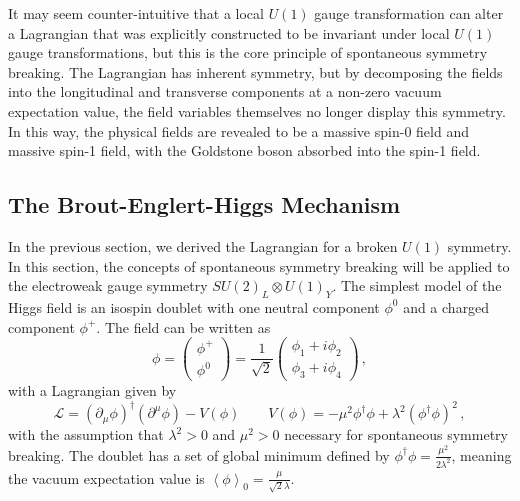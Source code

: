 It may seem counter-intuitive that a local $U(1)$ gauge transformation can alter a Lagrangian that was explicitly constructed to be invariant under local $U(1)$ gauge transformations, but this is the core principle of spontaneous symmetry breaking. The Lagrangian has inherent symmetry, but by decomposing the fields into the longitudinal and transverse components at a non-zero vacuum expectation value, the field variables themselves no longer display this symmetry. In this way, the physical fields are revealed to be a massive spin-0 field and massive spin-1 field, with the Goldstone boson absorbed into the spin-1 field.

\subsection{The Brout-Englert-Higgs Mechanism} \label{sec:sm_theory_beh}
In the previous section, we derived the Lagrangian for a broken $U(1)$ symmetry. In this section, the concepts of spontaneous symmetry breaking will be applied to the electroweak gauge symmetry $SU(2)_L\otimes U(1)_Y$. The simplest model of the Higgs field is an isospin doublet with one neutral component $\phi^0$ and a charged component $\phi^+$. The field can be written as
\begin{equation}
	\phi=\begin{pmatrix}\phi^+\\\phi^0\end{pmatrix}=\frac{1}{\sqrt{2}}\begin{pmatrix}\phi_1+i\phi_2\\\phi_3+i\phi_4\end{pmatrix}\,,
\end{equation}
with a Lagrangian given by
\begin{equation}
	\mathcal{L}=(\partial_\mu\phi)^\dagger(\partial^\mu\phi)-V(\phi) \qquad V(\phi)=-\mu^2\phi^\dagger\phi+\lambda^2(\phi^\dagger\phi)^2\,,
\end{equation}
with the assumption that $\lambda^2>0$ and $\mu^2>0$ necessary for spontaneous symmetry breaking.  The doublet has a set of global minimum defined by $\phi^\dagger\phi=\frac{\mu^2}{2\lambda^2}$, meaning the vacuum expectation value is $\left<\phi\right>_0=\frac{\mu}{\sqrt{2}\lambda}$.

